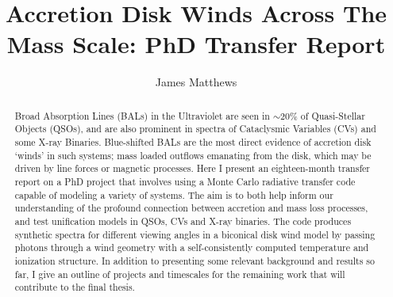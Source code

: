 \documentclass[useAMS,usenatbib,onecolumn]{mn2e2}
\begin{document}

\renewcommand{\labelitemi}{$-$}
\def\la{Ly-$\alpha$ }
\def\py{\textsc{Python} }
\def\tar{\textsc{Tardis} }
\def\cld{\textsc{Cloudy} }
\def\civ{C~\textsc{iv} }
\def\araa{ARAA}
\def\nat{Nature}
\def\apjl{ApJ Letters}
\def\aapr{AAPR}
\def\ssr{SSR}
\def\apj{ApJ}
\def\pasp{PASP}
\def\aap{A\&A}
\def\mnras{MNRAS}
\def\aj{AJ}
\def\rmxaa{RMXAA}

%
%

\title{Accretion Disk Winds Across The Mass Scale: PhD Transfer Report}


\author{James Matthews }


%
%

\maketitle


\begin{abstract} 
Broad Absorption Lines (BALs) in the Ultraviolet 
are seen in $\sim20\%$ of Quasi-Stellar Objects (QSOs), and 
are also prominent in spectra of Cataclysmic Variables (CVs)
and some X-ray Binaries. Blue-shifted BALs are the most direct evidence of 
accretion disk `winds' in such systems; mass loaded outflows
emanating from the disk, which may be driven by line forces or
magnetic processes. Here I present an eighteen-month transfer report
on a PhD project that involves using a Monte Carlo radiative transfer code
capable of modeling a variety of systems. The aim is to both
help inform our understanding of the profound connection between 
accretion and mass loss processes, and test unification models in QSOs, CVs and X-ray binaries. 
The code produces synthetic spectra for different viewing angles in
a biconical disk wind model by passing photons through a wind geometry
with a self-consistently computed temperature and ionization structure.
In addition to presenting some relevant background and results so far,
I give an outline of projects and timescales for the remaining work
that will contribute to the final thesis.
\end{abstract}
\end{document}
